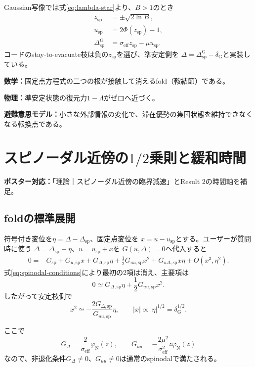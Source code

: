 \documentclass[a4paper,12pt]{ltjsarticle}
\newcommand{\PosterMap}[1]{%
  \begin{tcolorbox}[enhanced,boxrule=0pt,arc=1mm,colback=softgray,
    left=2mm,right=2mm,top=1mm,bottom=1mm,before skip=0pt,after skip=0.7em]
  \normalsize\textbf{ポスター対応：}#1
  \end{tcolorbox}}
\newcommand{\Meaning}[3]{%
  \begin{tcolorbox}[enhanced,breakable,colback=softteal,colframe=teal,
    boxrule=0.6pt,arc=1.2mm,left=3mm,right=3mm,top=2mm,bottom=2mm,
    title=式の読み方,fonttitle=\bfseries]
  \textbf{数学：}#1\par
  \textbf{物理：}#2\par
  \textbf{避難意思モデル：}#3
  \end{tcolorbox}}
\newcommand{\NormalCDF}{\Phi}
\newcommand{\NormalPDF}{\varphi_{\mathrm N}}
\newcommand{\Gauss}{\mathrm G}
\begin{document}
Gaussian写像では式\eqref{eq:lambda-star}より、$B>1$のとき
\begin{align}
 z_{\mathrm{sp}}&=\pm\sqrt{2\ln B},\label{eq:z-spinodal}\\
 u_{\mathrm{sp}}&=2\NormalCDF(z_{\mathrm{sp}})-1,\\
 \Delta_{\mathrm{sp}}^{\Gauss}
 &=\sigma_{\mathrm{eff}}z_{\mathrm{sp}}-\mu u_{\mathrm{sp}}.
 \label{eq:delta-spinodal}
\end{align}
コードのstay-to-evacuate枝は負の$z_{\mathrm{sp}}$を選び、準安定側を
$\Delta=\Delta_{\mathrm{sp}}^{\Gauss}-\delta_{\Gauss}$と実装している。

\Meaning
{固定点方程式の二つの根が接触して消えるfold（鞍結節）である。}
{準安定状態の復元力$1-\Lambda$がゼロへ近づく。}
{小さな外部情報の変化で、滞在優勢の集団状態を維持できなくなる転換点である。}

\section{スピノーダル近傍の\texorpdfstring{$1/2$}{1/2}乗則と緩和時間}\label{sec:spinodal-scaling}
\PosterMap{「理論｜スピノーダル近傍の臨界減速」とResult 2の時間軸を補足。}

\subsection{foldの標準展開}

符号付き変位を$\eta=\Delta-\Delta_{\mathrm{sp}}$、固定点変位を
$x=u-u_{\mathrm{sp}}$とする。ユーザーが質問時に使う
$\Delta=\Delta_{\mathrm{sp}}+\eta$、$u=u_{\mathrm{sp}}+x$を
$G(u,\Delta)=0$へ代入すると
\begin{align}
 0={}&G_{\mathrm{sp}}+G_{u,\mathrm{sp}}x+G_{\Delta,\mathrm{sp}}\eta
 +\frac12G_{uu,\mathrm{sp}}x^2
 +G_{u\Delta,\mathrm{sp}}x\eta+O(x^3,\eta^2).
\end{align}
式\eqref{eq:spinodal-conditions}により最初の2項は消え、主要項は
\begin{equation}
 0\simeq G_{\Delta,\mathrm{sp}}\eta
 +\frac12G_{uu,\mathrm{sp}}x^2.
 \label{eq:spinodal-normal-form}
\end{equation}
したがって安定枝側で
\begin{equation}
 x^2\simeq-\frac{2G_{\Delta,\mathrm{sp}}}{G_{uu,\mathrm{sp}}}\eta,
 \qquad |x|\propto |\eta|^{1/2}=\delta_{\Gauss}^{1/2}.
 \label{eq:x-sqrt-delta}
\end{equation}

ここで
\begin{equation}
 G_\Delta=\frac{2}{\sigma_{\mathrm{eff}}}\NormalPDF(z),
 \qquad
 G_{uu}=-\frac{2\mu^2}{\sigma_{\mathrm{eff}}^2}z\NormalPDF(z)
\end{equation}
なので、非退化条件$G_\Delta\neq0$、$G_{uu}\neq0$は通常のspinodalで満たされる。
\end{document}
